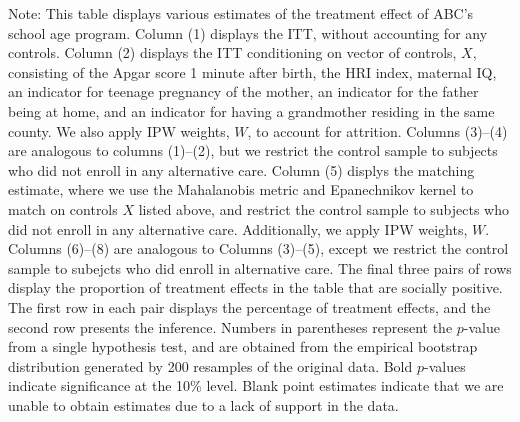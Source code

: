 \begin{table}[H]
\begin{threeparttable}
\begin{tabular}{cccccccccc}
  \hline\hline
  \end{tabular}
    \begin{tablenotes}
    \scriptsize
    \item 
Note: This table displays various estimates of the treatment effect of ABC's school age program.
Column (1) displays the ITT, without accounting for any controls.
Column (2) displays the ITT conditioning on vector of controls, $X$, consisting of the Apgar score 1 minute after birth, the HRI index, maternal IQ, an
indicator for teenage pregnancy of the mother, an indicator for the father being at 
home, and an indicator for having a grandmother residing in the same county. We also apply IPW weights, $W$, to account for attrition.
Columns (3)--(4) are analogous to columns (1)--(2), but we restrict the control sample to subjects
who did not enroll in any alternative care.
Column (5) displys the matching estimate, where we use the Mahalanobis metric and Epanechnikov kernel
to match on controls $X$ listed above, and restrict the control sample to subjects who did not enroll
in any alternative care. Additionally, we apply IPW weights, $W$.
Columns (6)--(8) are analogous to Columns (3)--(5), except we restrict the control sample to subejcts
who did enroll in alternative care. The final three pairs of rows display the proportion of treatment effects in the table that are 
socially positive. The first row in each pair displays the percentage of treatment effects, and the
second row presents the inference. 
Numbers in parentheses represent the $p$-value from a single hypothesis test, and are obtained from 
the empirical bootstrap distribution generated by 200 resamples of the original data. 
Bold $p$-values indicate significance at the 10\% level.
Blank point estimates indicate that we are unable to obtain estimates due to a lack of support in the data. 

    \end{tablenotes}
  \end{threeparttable}

\end{table}